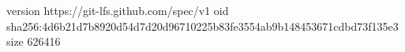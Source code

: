 version https://git-lfs.github.com/spec/v1
oid sha256:4d6b21d7b8920d54d7d20d96710225b83fe3554ab9b148453671cdbd73f135e3
size 626416
